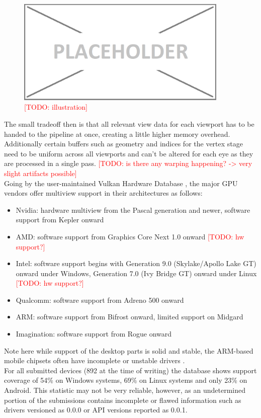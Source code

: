 \begin{figure}[htb]
  \centering
  \includegraphics[width=0.9\textwidth]{pictures/placeholder}
  \caption{\textcolor{red}{[TODO: illustration]}} \label{fig:blob}
\end{figure}

The small tradeoff then is that all relevant view data for each viewport has to be handed to the pipeline at once, creating a little higher memory overhead. Additionally certain buffers such as geometry and indices for the vertex stage need to be uniform across all viewports and can't be altered for each eye as they are processed in a single pass. \textcolor{red}{[TODO: is there any warping happening? -> very slight artifacts possible]} \\

Going by the user-maintained Vulkan Hardware Database \cite{Willems.2020}, the major GPU vendors offer multiview support in their architectures as follows: 
\begin{itemize}
\item Nvidia: hardware multiview from the Pascal generation and newer, software support from Kepler onward
\item AMD: software support from Graphics Core Next 1.0 onward \textcolor{red}{[TODO: hw support?]}
\item Intel: software support begins with Generation 9.0 (Skylake/Apollo Lake GT) onward under Windows, Generation 7.0 (Ivy Bridge GT) onward under Linux \textcolor{red}{[TODO: hw support?]}
\item Qualcomm: software support from Adreno 500 onward
\item ARM: software support from Bifrost onward, limited support on Midgard
\item Imagination: software support from Rogue onward
\end{itemize}
Note here while support of the desktop parts is solid and stable, the ARM-based mobile chipsets often have incomplete or unstable drivers \cite{Willems.2019}\cite{JMC47.2018}. \\
For all submitted devices (892 at the time of writing) the database shows support coverage of 54\% on Windows systems, 69\% on Linux systems and only 23\% on Android. This statistic may not be very reliable, however, as an undetermined portion of the submissions contains incomplete or flawed information such as drivers versioned as 0.0.0 or API versions reported as 0.0.1. 

